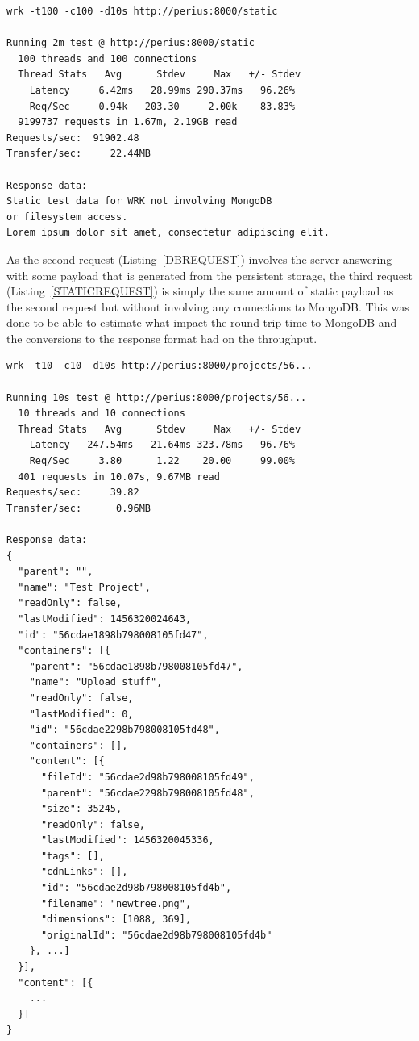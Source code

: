 \documentclass[a4paper,12pt]{article}
\newenvironment{custommargins}[2]%
  {\addtolength{\leftskip}{#1}\addtolength{\rightskip}{#2}}{\par}
\begin{document}
\newpage
\begin{custommargins}{0cm}{-2cm}
\begin{minipage}{\linewidth-1cm}
\begin{lstlisting}[label=STATICREQUEST,caption=Result of static text requests]
wrk -t100 -c100 -d10s http://perius:8000/static

Running 2m test @ http://perius:8000/static
  100 threads and 100 connections
  Thread Stats   Avg      Stdev     Max   +/- Stdev
    Latency     6.42ms   28.99ms 290.37ms   96.26%
    Req/Sec     0.94k   203.30     2.00k    83.83%
  9199737 requests in 1.67m, 2.19GB read
Requests/sec:  91902.48
Transfer/sec:     22.44MB

Response data:
Static test data for WRK not involving MongoDB 
or filesystem access. 
Lorem ipsum dolor sit amet, consectetur adipiscing elit.
\end{lstlisting}
\end{minipage}
\end{custommargins}

\par
As the second request (Listing~\ref{DBREQUEST}) involves the server answering with some payload that
is generated from the persistent storage, the third request (Listing~\ref{STATICREQUEST}) is simply
the same amount of static payload as the second request but without involving any connections to
MongoDB. This was done to be able to estimate what impact the round trip time to MongoDB and the
conversions to the response format had on the throughput.

\begin{minipage}{\linewidth-1cm}
\begin{lstlisting}[label=TREEREQUEST,caption=Result of project tree requests]
wrk -t10 -c10 -d10s http://perius:8000/projects/56...
 
Running 10s test @ http://perius:8000/projects/56...
  10 threads and 10 connections
  Thread Stats   Avg      Stdev     Max   +/- Stdev
    Latency   247.54ms   21.64ms 323.78ms   96.76%
    Req/Sec     3.80      1.22    20.00     99.00%
  401 requests in 10.07s, 9.67MB read
Requests/sec:     39.82
Transfer/sec:      0.96MB

Response data:
{
  "parent": "",
  "name": "Test Project",
  "readOnly": false,
  "lastModified": 1456320024643,
  "id": "56cdae1898b798008105fd47",
  "containers": [{
    "parent": "56cdae1898b798008105fd47",
    "name": "Upload stuff",
    "readOnly": false,
    "lastModified": 0,
    "id": "56cdae2298b798008105fd48",
    "containers": [],
    "content": [{
      "fileId": "56cdae2d98b798008105fd49",
      "parent": "56cdae2298b798008105fd48",
      "size": 35245,
      "readOnly": false,
      "lastModified": 1456320045336,
      "tags": [],
      "cdnLinks": [],
      "id": "56cdae2d98b798008105fd4b",
      "filename": "newtree.png",
      "dimensions": [1088, 369],
      "originalId": "56cdae2d98b798008105fd4b"
    }, ...]
  }],
  "content": [{
    ...
  }]
}
\end{lstlisting}
\end{minipage}
\end{document}
